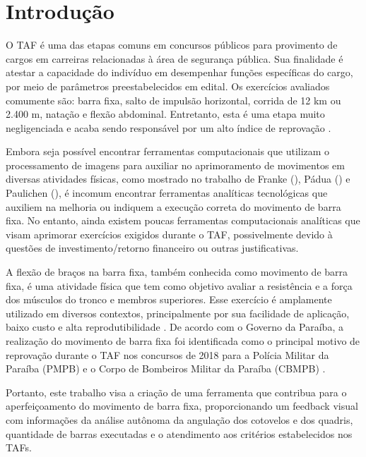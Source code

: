 \chapter{Introdução}


O \ac{TAF} é uma das etapas comuns em concursos públicos para provimento de cargos em carreiras relacionadas à área de segurança pública. Sua finalidade é atestar a capacidade do indivíduo em desempenhar funções específicas do cargo, por meio de parâmetros preestabelecidos em edital. Os exercícios avaliados comumente são: barra fixa, salto de impulsão horizontal, corrida de 12 km ou 2.400 m, natação e flexão abdominal. Entretanto, esta é uma etapa muito negligenciada e acaba sendo responsável por um alto índice de reprovação \cite{reprovaTAF}.

Embora seja possível encontrar ferramentas computacionais que utilizam o processamento de imagens para auxiliar no aprimoramento de movimentos em diversas atividades físicas, como mostrado no trabalho de Franke (\citeyear{vcBicicleta}), Pádua (\citeyear{vcFutebol}) e Paulichen (\citeyear{futebolTatica}), é incomum encontrar ferramentas analíticas tecnológicas que auxiliem na melhoria ou indiquem a execução correta do movimento de barra fixa. No entanto, ainda existem poucas ferramentas computacionais analíticas que visam aprimorar exercícios exigidos durante o \ac{TAF}, possivelmente devido à questões de investimento/retorno financeiro ou outras justificativas.

A flexão de braços na barra fixa, também conhecida como movimento de barra fixa, é uma atividade física que tem como objetivo avaliar a resistência e a força dos músculos do tronco e membros superiores. Esse exercício é amplamente utilizado em diversos contextos, principalmente por sua facilidade de aplicação, baixo custo e alta reprodutibilidade \cite{barraFixa}. De acordo com o Governo da Paraíba, a realização do movimento de barra fixa foi identificada como o principal motivo de reprovação durante o \ac{TAF} nos concursos de 2018 para a Polícia Militar da Paraíba (PMPB) e o Corpo de Bombeiros Militar da Paraíba (CBMPB) \cite{barraTAF}.

Portanto, este trabalho visa a criação de uma ferramenta que contribua para o aperfeiçoamento do movimento de barra fixa, proporcionando um feedback visual com informações da análise autônoma da angulação dos cotovelos e dos quadris, quantidade de barras executadas e o atendimento aos critérios estabelecidos nos \ac{TAF}s.